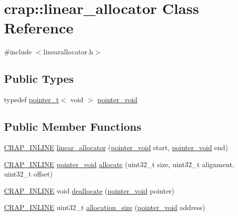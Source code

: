 \hypertarget{classcrap_1_1linear__allocator}{\section{crap\+:\+:linear\+\_\+allocator Class Reference}
\label{classcrap_1_1linear__allocator}
}


{\ttfamily \#include $<$linearallocator.\+h$>$}

\subsection*{Public Types}
\begin{DoxyCompactItemize}
\item 
typedef \hyperlink{structcrap_1_1pointer__t}{pointer\+\_\+t}$<$ void $>$ \hyperlink{classcrap_1_1linear__allocator_a1caef970a097c32e6266ba996d42b8de}{pointer\+\_\+void}
\end{DoxyCompactItemize}
\subsection*{Public Member Functions}
\begin{DoxyCompactItemize}
\item 
\hyperlink{config__x86_8h_a5a40526b8d842e7ff731509998bb0f1c}{C\+R\+A\+P\+\_\+\+I\+N\+L\+I\+N\+E} \hyperlink{classcrap_1_1linear__allocator_a172dc88215455f34b047121ddb23ed19}{linear\+\_\+allocator} (\hyperlink{classcrap_1_1linear__allocator_a1caef970a097c32e6266ba996d42b8de}{pointer\+\_\+void} start, \hyperlink{classcrap_1_1linear__allocator_a1caef970a097c32e6266ba996d42b8de}{pointer\+\_\+void} end)
\item 
\hyperlink{config__x86_8h_a5a40526b8d842e7ff731509998bb0f1c}{C\+R\+A\+P\+\_\+\+I\+N\+L\+I\+N\+E} \hyperlink{classcrap_1_1linear__allocator_a1caef970a097c32e6266ba996d42b8de}{pointer\+\_\+void} \hyperlink{classcrap_1_1linear__allocator_a5c83cd8e412b0fd869c0db033f30bde2}{allocate} (uint32\+\_\+t size, uint32\+\_\+t alignment, uint32\+\_\+t offset)
\item 
\hyperlink{config__x86_8h_a5a40526b8d842e7ff731509998bb0f1c}{C\+R\+A\+P\+\_\+\+I\+N\+L\+I\+N\+E} void \hyperlink{classcrap_1_1linear__allocator_ad24fca761b1e5a8efcad88dd49289eef}{deallocate} (\hyperlink{classcrap_1_1linear__allocator_a1caef970a097c32e6266ba996d42b8de}{pointer\+\_\+void} pointer)
\item 
\hyperlink{config__x86_8h_a5a40526b8d842e7ff731509998bb0f1c}{C\+R\+A\+P\+\_\+\+I\+N\+L\+I\+N\+E} uint32\+\_\+t \hyperlink{classcrap_1_1linear__allocator_ab20cb4ab268ebe9907bbc65e0281203e}{allocation\+\_\+size} (\hyperlink{classcrap_1_1linear__allocator_a1caef970a097c32e6266ba996d42b8de}{pointer\+\_\+void} address)
\end{DoxyCompactItemize}


